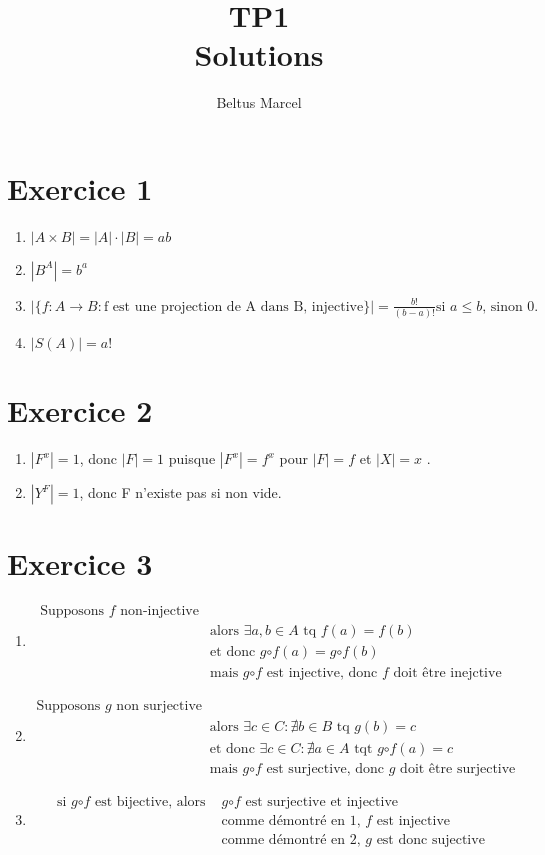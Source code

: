 \documentclass[fontsize=10pt]{article}
\title{\textbf{TP1}\\ Solutions}
\author{Beltus Marcel}
\date{}
\begin{document}
\maketitle %


\section*{Exercice 1}
\begin{enumerate}
\item $|A\times B | = |A|\cdot|B|=ab$
\item $|B^A|=b^a$
\item $|\{f:A \rightarrow B : \text{f est une projection de A dans B, injective}\}| = \frac{b!}{(b-a)!}\text{si $a \leq b$, sinon 0.}$
\item $|S(A)| = a!$
\end{enumerate}
\section*{Exercice 2}
\begin{enumerate}
\item $|F^x| = 1$, donc $|F|=1$ puisque $|F^x|=f^x$ pour $|F|=f$ et $|X|=x$ .
\item $|Y^F|=1$, donc F n'existe pas si non vide.
\end{enumerate}

\section*{Exercice 3}
\begin{enumerate}
\item \begin{align*}
\text{Supposons $f$ non-injective}&\\
&\text{alors } \exists a,b \in A \text{ tq } f(a)=f(b)\\
&\text{et donc } g\mathord\circ f (a) = g\mathord\circ f (b)\\
&\text{mais }g\mathord\circ f \text{ est injective, donc $f$ doit être inejctive}
\end{align*}
\item \begin{align*}
\text{Supposons $g$ non surjective}& \\
&\text{alors } \exists c \in C : \nexists b \in B \text{ tq } g(b) = c\\
&\text{et donc }\exists c \in C : \nexists a \in A \text{ tqt } g\mathord\circ f(a ) = c\\
&\text{mais $g\mathord\circ f$ est surjective, donc $g$ doit être surjective}
\end{align*}
\item \begin{align*}
\text{si $g\mathord\circ f$ est bijective, alors }&\text{$g\mathord\circ f$ est surjective et injective}\\
& \text{comme démontré en 1, $f$ est injective}\\
& \text{comme démontré en 2, $g$ est donc sujective}
\end{align*}
\end{enumerate}
\end{document}
